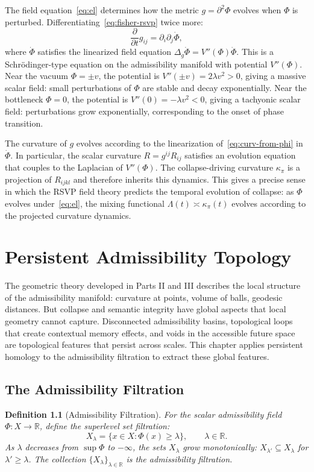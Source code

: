 \documentclass[12pt, oneside]{book}
\theoremstyle{plain-flyxion}
\theoremstyle{definition-flyxion}
\newtheorem{definition}[theorem]{Definition}
\newcommand{\kpi}{\kappa_{\pi}}
\newcommand{\Lam}{\Lambda}
\begin{document}
The field equation~\eqref{eq:el} determines how the metric $g = \partial^2\Phi$ evolves
when $\Phi$ is perturbed. Differentiating~\eqref{eq:fisher-rsvp} twice more:
\[
\frac{\partial}{\partial t} g_{ij} = \partial_i\partial_j \dot\Phi,
\]
where $\dot\Phi$ satisfies the linearized field equation $\Delta_g\dot\Phi = V''(\Phi)
\dot\Phi$. This is a Schrödinger-type equation on the admissibility manifold with
potential $V''(\Phi)$. Near the vacuum $\Phi = \pm v$, the potential is $V''(\pm v) =
2\lambda v^2 > 0$, giving a massive scalar field: small perturbations of $\Phi$ are
stable and decay exponentially. Near the bottleneck $\Phi = 0$, the potential is
$V''(0) = -\lambda v^2 < 0$, giving a tachyonic scalar field: perturbations grow
exponentially, corresponding to the onset of phase transition.

The curvature of $g$ evolves according to the linearization of~\eqref{eq:curv-from-phi}
in $\dot\Phi$. In particular, the scalar curvature $R = g^{ij}R_{ij}$ satisfies an
evolution equation that couples to the Laplacian of $V''(\Phi)$. The collapse-driving
curvature $\kpi$ is a projection of $R_{ijkl}$ and therefore inherits this dynamics.
This gives a precise sense in which the RSVP field theory predicts the temporal evolution
of collapse: as $\Phi$ evolves under~\eqref{eq:el}, the mixing functional $\Lam(t) \asymp
\kpi(t)$ evolves according to the projected curvature dynamics.

\chapter{Persistent Admissibility Topology}

The geometric theory developed in Parts II and III describes the local structure of the
admissibility manifold: curvature at points, volume of balls, geodesic distances. But
collapse and semantic integrity have global aspects that local geometry cannot capture.
Disconnected admissibility basins, topological loops that create contextual memory
effects, and voids in the accessible future space are topological features that persist
across scales. This chapter applies persistent homology to the admissibility filtration
to extract these global features.

\section{The Admissibility Filtration}

\begin{definition}[Admissibility Filtration]\label{def:filtration}
For the scalar admissibility field $\Phi: X \to \mathbb{R}$, define the
\emph{superlevel set filtration}:
\begin{equation}\label{eq:filtration}
X_\lambda = \{x \in X : \Phi(x) \geq \lambda\}, \qquad \lambda \in \mathbb{R}.
\end{equation}
As $\lambda$ decreases from $\sup\Phi$ to $-\infty$, the sets $X_\lambda$ grow
monotonically: $X_{\lambda'} \subseteq X_\lambda$ for $\lambda' \geq \lambda$.
The collection $\{X_\lambda\}_{\lambda \in \mathbb{R}}$ is the admissibility filtration.
\end{definition}
\end{document}
